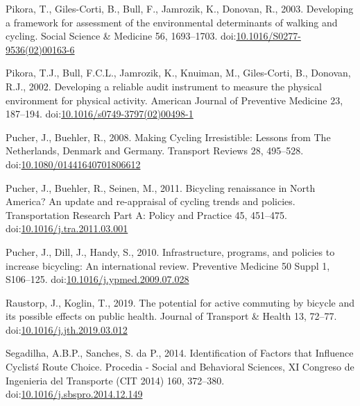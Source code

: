 \documentclass[]{elsarticle} %
\begin{document}
\leavevmode\hypertarget{ref-pikoraDevelopingFrameworkAssessment2003}{}%
Pikora, T., Giles-Corti, B., Bull, F., Jamrozik, K., Donovan, R., 2003.
Developing a framework for assessment of the environmental determinants
of walking and cycling. Social Science \& Medicine 56, 1693--1703.
doi:\href{https://doi.org/10.1016/S0277-9536(02)00163-6}{10.1016/S0277-9536(02)00163-6}

\leavevmode\hypertarget{ref-pikoraDevelopingReliableAudit2002}{}%
Pikora, T.J., Bull, F.C.L., Jamrozik, K., Knuiman, M., Giles-Corti, B.,
Donovan, R.J., 2002. Developing a reliable audit instrument to measure
the physical environment for physical activity. American Journal of
Preventive Medicine 23, 187--194.
doi:\href{https://doi.org/10.1016/s0749-3797(02)00498-1}{10.1016/s0749-3797(02)00498-1}

\leavevmode\hypertarget{ref-pucherMakingCyclingIrresistible2008}{}%
Pucher, J., Buehler, R., 2008. Making Cycling Irresistible: Lessons from
The Netherlands, Denmark and Germany. Transport Reviews 28, 495--528.
doi:\href{https://doi.org/10.1080/01441640701806612}{10.1080/01441640701806612}

\leavevmode\hypertarget{ref-pucherBicyclingRenaissanceNorth2011a}{}%
Pucher, J., Buehler, R., Seinen, M., 2011. Bicycling renaissance in
North America? An update and re-appraisal of cycling trends and
policies. Transportation Research Part A: Policy and Practice 45,
451--475.
doi:\href{https://doi.org/10.1016/j.tra.2011.03.001}{10.1016/j.tra.2011.03.001}

\leavevmode\hypertarget{ref-pucherInfrastructureProgramsPolicies2010a}{}%
Pucher, J., Dill, J., Handy, S., 2010. Infrastructure, programs, and
policies to increase bicycling: An international review. Preventive
Medicine 50 Suppl 1, S106--125.
doi:\href{https://doi.org/10.1016/j.ypmed.2009.07.028}{10.1016/j.ypmed.2009.07.028}

\leavevmode\hypertarget{ref-raustorpPotentialActiveCommuting2019}{}%
Raustorp, J., Koglin, T., 2019. The potential for active commuting by
bicycle and its possible effects on public health. Journal of Transport
\& Health 13, 72--77.
doi:\href{https://doi.org/10.1016/j.jth.2019.03.012}{10.1016/j.jth.2019.03.012}

\leavevmode\hypertarget{ref-segadilhaIdentificationFactorsThat2014a}{}%
Segadilha, A.B.P., Sanches, S. da P., 2014. Identification of Factors
that Influence Cyclistś Route Choice. Procedia - Social and Behavioral
Sciences, XI Congreso de Ingenieria del Transporte (CIT 2014) 160,
372--380.
doi:\href{https://doi.org/10.1016/j.sbspro.2014.12.149}{10.1016/j.sbspro.2014.12.149}
\end{document}
